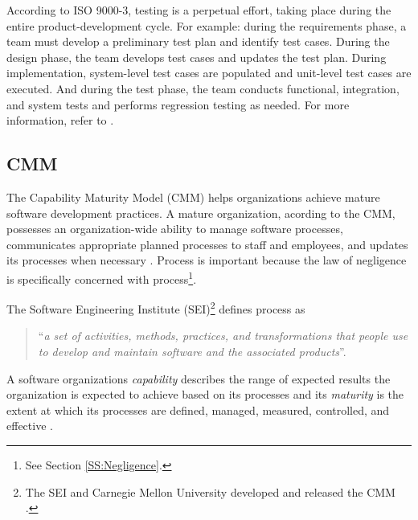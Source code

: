 According to ISO 9000-3, testing is a perpetual effort, taking place during the
entire product-development cycle. For example: during the requirements phase, a
team must develop a preliminary test plan and identify test cases. During the
design phase, the team develops test cases and updates the test plan. During
implementation, system-level test cases are populated and unit-level test cases
are executed. And during the test phase, the team conducts functional,
integration, and system tests and performs regression testing as needed. For
more information, refer to \cite{Kehoe96}.

\subsection{CMM}
The Capability Maturity Model (CMM) helps organizations achieve mature software
development practices. A mature organization, acording to the CMM, possesses an
organization-wide ability to manage software processes, communicates appropriate
planned processes to staff and employees, and updates its processes when
necessary \cite{CMM11}. Process is important because the law of negligence is
specifically concerned with process\footnote{See Section \ref{SS:Negligence}.}.

The Software Engineering Institute (SEI)\footnote{The SEI and Carnegie Mellon
University developed and released the CMM \cite{CMM11}.} defines process as
\begin{quote}
``\textit{a set of activities, methods, practices, and transformations that 
people use to develop and maintain software and the associated 
products}''\cite{CMM11}.
\end{quote}
A software organizations \textit{capability} describes the range of expected
results the organization is expected to achieve based on its processes and its
\textit{maturity} is the extent at which its processes are defined, managed,
measured, controlled, and effective \cite{CMM11}.

